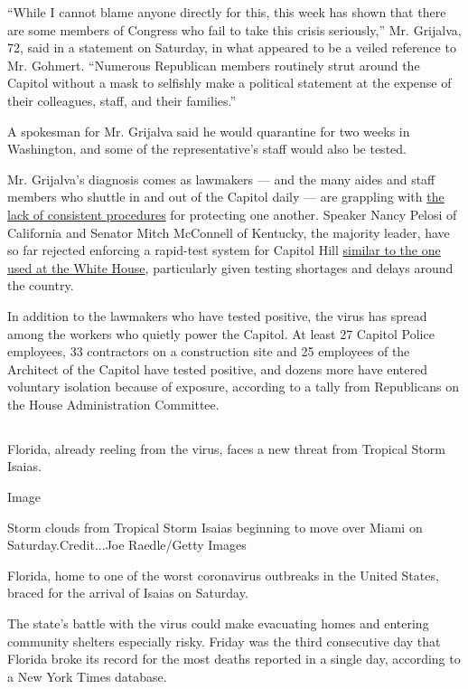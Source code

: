 ``While I cannot blame anyone directly for this, this week has shown
that there are some members of Congress who fail to take this crisis
seriously,'' Mr. Grijalva, 72, said in a statement on Saturday, in what
appeared to be a veiled reference to Mr. Gohmert. ``Numerous Republican
members routinely strut around the Capitol without a mask to selfishly
make a political statement at the expense of their colleagues, staff,
and their families.''

A spokesman for Mr. Grijalva said he would quarantine for two weeks in
Washington, and some of the representative's staff would also be tested.

Mr. Grijalva's diagnosis comes as lawmakers --- and the many aides and
staff members who shuttle in and out of the Capitol daily --- are
grappling with
\href{https://www.nytimes.com/2020/07/30/us/politics/gohmert-coronavirus-congress.html}{the
lack of consistent procedures} for protecting one another. Speaker Nancy
Pelosi of California and Senator Mitch McConnell of Kentucky, the
majority leader, have so far rejected enforcing a rapid-test system for
Capitol Hill
\href{https://www.nytimes.com/2020/05/01/us/politics/coronavirus-testing-senate-white-house.html}{similar
to the one used at the White House}, particularly given testing
shortages and delays around the country.

In addition to the lawmakers who have tested positive, the virus has
spread among the workers who quietly power the Capitol. At least 27
Capitol Police employees, 33 contractors on a construction site and 25
employees of the Architect of the Capitol have tested positive, and
dozens more have entered voluntary isolation because of exposure,
according to a tally from Republicans on the House Administration
Committee.

\hypertarget{-5}{%
\subsection{}\label{-5}}

Florida, already reeling from the virus, faces a new threat from
Tropical Storm Isaias.

Image

Storm clouds from Tropical Storm Isaias beginning to move over Miami on
Saturday.Credit...Joe Raedle/Getty Images

Florida, home to one of the worst coronavirus outbreaks in the United
States, braced for the arrival of Isaias on Saturday.

The state's battle with the virus could make evacuating homes and
entering community shelters especially risky. Friday was the third
consecutive day that Florida broke its record for the most deaths
reported in a single day, according to a New York Times database.


